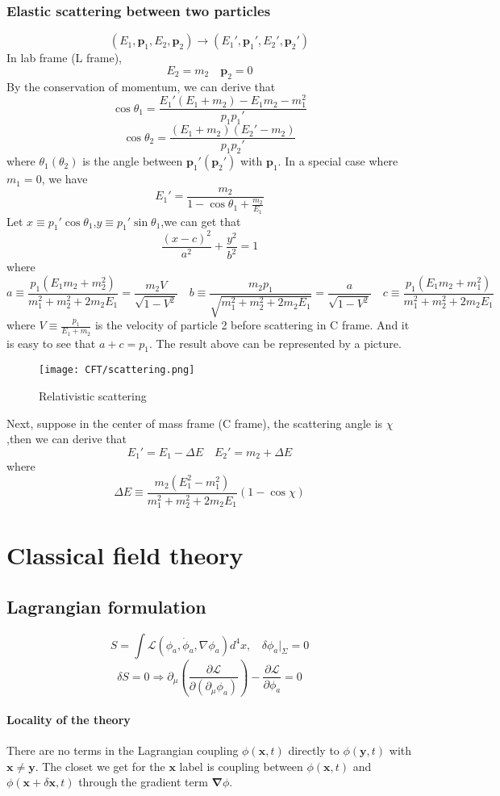 \subsection{Elastic scattering between two particles}
\[(E_1,\bm{p}_1,E_2,\bm{p}_2) \to (E_1',\bm{p}_1',E_2',\bm{p}_2')\]
In lab frame (L frame),
\[E_2 = m_2 \quad \bm{p}_2 = 0\]
By the conservation of momentum, we can derive that
\[\cos \theta_1 = \frac{E_1'(E_1+m_2)-E_1 m_2 - m_1^2}{p_1 p_1'}\]
\[\cos \theta_2 = \frac{(E_1+m_2)(E_2'-m_2)}{p_1 p_2'}\]
where $\theta_1(\theta_2)$ is the angle between $\bm{p}_1'(\bm{p}_2')$ with $\bm{p}_1$.
In a special case where $m_1 =0$, we have
\[E_1' = \frac{m_2}{1-\cos\theta_1 + \frac{m_2}{E_1}}\]
Let $x \equiv p_1'\cos\theta_1$,$y \equiv p_1'\sin\theta_1$,we can get that
\[\frac{(x-c)^2}{a^2}+\frac{y^2}{b^2}=1\]
where
\[a \equiv \frac{p_1(E_1m_2+m_2^2)}{m_1^2 + m_2^2 + 2m_2 E_1} = \frac{m_2V}{\sqrt{1-V^2}} \quad b \equiv \frac{m_2 p_1}{\sqrt{m_1^2 + m_2^2 + 2m_2 E_1}} = \frac{a}{\sqrt{1-V^2}} \quad c \equiv \frac{ p_1(E_1m_2+m_1^2)}{m_1^2 + m_2^2 + 2m_2 E_1}\]
where $V \equiv \frac{p_1}{E_1 + m_2}$ is the velocity of particle 2 before scattering in C frame. 
And it is easy to see that $a + c = p_1$. 
The result above can be represented by a picture.
\begin{figure}[!h]
	\centering
	\texttt{[image: CFT/scattering.png]}
	\caption{Relativistic scattering}
\end{figure}
\noindent
Next, suppose in the center of mass frame (C frame), the scattering angle is $\chi$,then we can derive that
\[E_1' = E_1 - \Delta E \quad E_2' = m_2 + \Delta E\]
where
\[\Delta E \equiv \frac{m_2(E_1^2-m_1^2)}{m_1^2 + m_2^2 + 2m_2E_1}(1-\cos\chi)\]

\chapter{Classical field theory}
\section{Lagrangian formulation}
\[S = \int \mathcal{L}(\phi_a,\dot{\phi}_a,\nabla \phi_a) d^4 x, \ \ \ \ \delta \phi_a |_{\Sigma} = 0\]
\[\delta S = 0 \Rightarrow \partial_{\mu} \left (\frac{\partial \mathcal{L}}{\partial (\partial_{\mu} \phi_a)} \right ) - \frac{\partial \mathcal{L}}{\partial \phi_a} = 0\]
\subsubsection{Locality of the theory}
There are no terms in the Lagrangian coupling $\phi(\bm{x},t)$ directly to  $\phi(\bm{y},t)$ with $\bm{x} \neq \bm{y}$. The closet we get for the $\bm{x}$ label is coupling between $\phi(\bm{x},t)$ and $\phi(\bm{x}+\delta\bm{x},t)$ through the gradient term $\bm{\nabla} \phi$.
